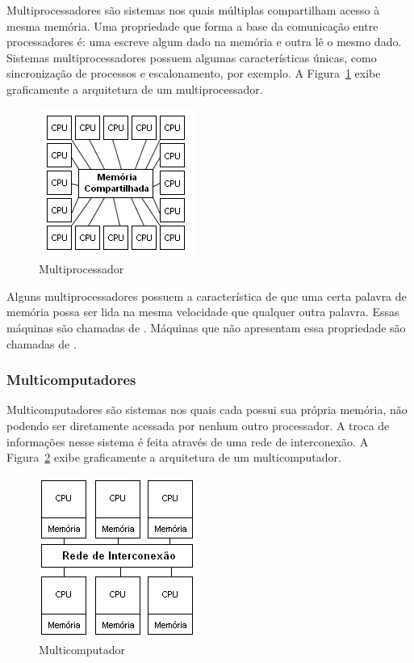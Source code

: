 Multiprocessadores são sistemas nos quais múltiplas \cpus compartilham acesso à mesma memória. Uma propriedade que forma a base da comunicação entre processadores é: uma \cpu escreve algum dado na memória e outra lê o mesmo dado. Sistemas multiprocessadores possuem algumas características únicas, como sincronização de processos e escalonamento, por exemplo. A Figura~\ref{fig:mproc} exibe graficamente a arquitetura de um multiprocessador.

\begin{figure}[t]
    \centering
    \includegraphics{Images/Multiprocessador.jpg}
    \caption{Multiprocessador}\label{fig:mproc}
\end{figure}

Alguns multiprocessadores possuem a característica de que uma certa palavra de memória possa ser lida na mesma velocidade que qualquer outra palavra. Essas máquinas são chamadas de \uma. Máquinas que não apresentam essa propriedade são chamadas de \numa \cite{Tanenbaum2015}.

\subsubsection{Multicomputadores}

Multicomputadores são sistemas nos quais cada \cpu possui sua própria memória, não podendo ser diretamente acessada por nenhum outro processador. A troca de informações nesse sistema é feita através de uma rede de interconexão. A Figura~\ref{fig:mcomp} exibe graficamente a arquitetura de um multicomputador.

\begin{figure}[t]
    \centering
    \includegraphics{Images/Multicomputador.jpg}
    \caption{Multicomputador}\label{fig:mcomp}
\end{figure}

